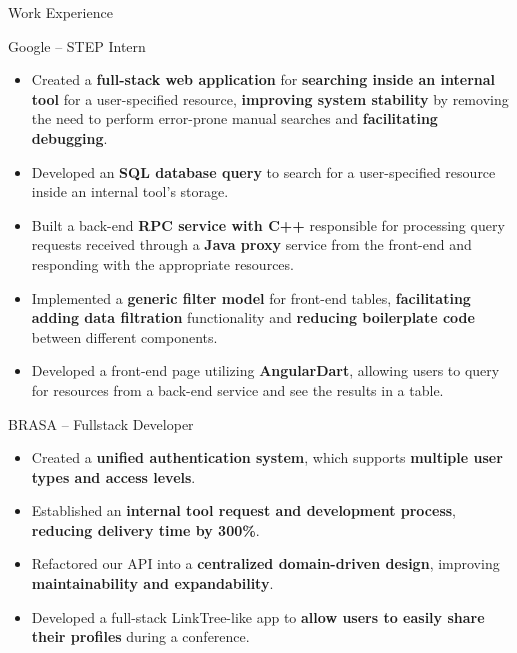 \documentclass{article}
\newlength{\tabin}
\newlength{\secsep}
\newcommand{\lineunder}{\vspace*{-8pt} \\ \hspace*{-6pt} \hrulefill \\ \vspace*{-15pt}}
\newenvironment{tabbedsection}[1]{
  \begin{list}{}{
      \setlength{\itemsep}{0pt}
      \setlength{\labelsep}{0pt}
      \setlength{\labelwidth}{0pt}
      \setlength{\leftmargin}{\tabin}
      \setlength{\rightmargin}{\tabin}
      \setlength{\listparindent}{0pt}
      \setlength{\parsep}{0pt}
      \setlength{\parskip}{0pt}
      \setlength{\partopsep}{0pt}
      \setlength{\topsep}{#1}
    }
  \item[]
}{\end{list}}
\newenvironment{resume_section}[1]{
  \filbreak
  \vspace{2\secsep}
  \textsc{\large#1}
  \lineunder
  \begin{tabbedsection}{\secsep}
}{\end{tabbedsection}}
\newenvironment{resume_subsection}[2][]{
  \textbf{#2} \hfill {\footnotesize #1} \hspace{2em}
  \begin{tabbedsection}{0.5\secsep}
}{\end{tabbedsection}}
\newenvironment{subitems}{
  \renewcommand{\labelitemi}{-}
  \begin{itemize}
      \setlength{\labelsep}{1em}
}{\end{itemize}}
\begin{document}
\begin{resume_section}{Work Experience}

	\begin{resume_subsection}[Irvine, CA (2022.05 -- 2022.08)]{Google -- STEP Intern}
		\begin{subitems}
			\item Created a \textbf{full-stack web application} for \textbf{searching inside an internal tool} for a user-specified resource, \textbf{improving system stability} by removing the need to perform error-prone manual searches and \textbf{facilitating debugging}.
			\item Developed an \textbf{SQL database query} to search for a user-specified resource inside an internal tool's storage.
			\item Built a back-end \textbf{RPC service with C++} responsible for processing query requests received through a \textbf{Java proxy} service from the front-end and responding with the appropriate resources.
			\item Implemented a \textbf{generic filter model} for front-end tables, \textbf{facilitating adding data filtration} functionality and \textbf{reducing boilerplate code} between different components.
			\item Developed a front-end page utilizing \textbf{AngularDart}, allowing users to query for resources from a back-end service and see the results in a table.
		\end{subitems}	
	\end{resume_subsection}
	
	\begin{resume_subsection}{BRASA -- Fullstack Developer}
		\begin{subitems}
			\item Created a \textbf{unified authentication system}, which supports \textbf{multiple user types and access levels}.
			\item Established an \textbf{internal tool request and development process}, \textbf{reducing delivery time by 300\%}.
			\item Refactored our API into a \textbf{centralized domain-driven design}, improving \textbf{maintainability and expandability}.
			\item Developed a full-stack LinkTree-like app to \textbf{allow users to easily share their profiles} during a conference. 
		\end{subitems}
	\end{resume_subsection}

\end{resume_section}
\end{document}
